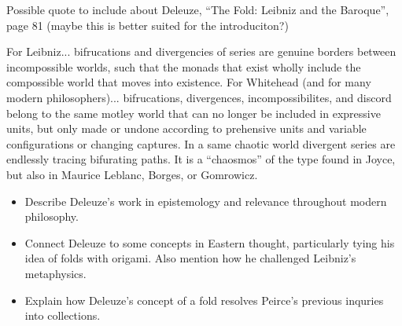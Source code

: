 Possible quote to include about Deleuze, ``The Fold: Leibniz and the Baroque'', page 81 (maybe this is better suited for the introduciton?)
\begin{displayquote}
For Leibniz... bifrucations and divergencies of series are genuine borders between incompossible worlds, such that the monads that exist wholly include the compossible world that moves into existence. For Whitehead (and for many modern philosophers)... bifrucations, divergences, incompossibilites, and discord belong to the same motley world that can no longer be included in expressive units, but only made or undone  according to prehensive units and variable configurations or changing captures. In a same chaotic world divergent series are endlessly tracing bifurating paths. It is a ``chaosmos'' of the  type found in Joyce, but also in Maurice Leblanc, Borges, or Gomrowicz.
\end{displayquote}

\begin{itemize}
  \item Describe Deleuze's work in epistemology and relevance throughout modern philosophy.
  \item Connect Deleuze to some concepts in Eastern thought, particularly tying his idea of folds with origami. Also mention how he challenged Leibniz's metaphysics.
  \item Explain how Deleuze's concept of a fold resolves Peirce's previous inquries into collections.
\end{itemize}
